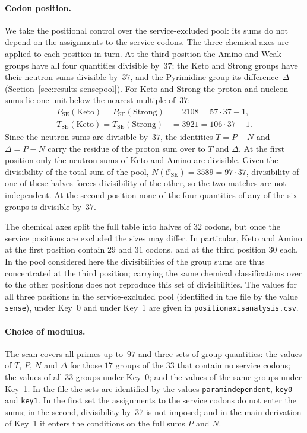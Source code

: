 \documentclass[11pt,a4paper]{article}
\renewcommand{\_}{\origunderscore\allowbreak}
\begin{document}
\paragraph{Codon position.}
We take the positional control over the service-excluded pool: its
sums do not depend on the assignments to the service codons. The
three chemical axes are applied to each position in turn. At the
third position the Amino and Weak groups have all four quantities
divisible by~$37$; the Keto and Strong groups have their neutron
sums divisible by~$37$, and the Pyrimidine group its
difference~$\Delta$ (Section~\ref{sec:results-sensepool}). For Keto
and Strong the proton and nucleon sums lie one unit below the
nearest multiple of~$37$:
\[
\begin{aligned}
P_{\mathrm{SE}}(\mathrm{Keto})
  = P_{\mathrm{SE}}(\mathrm{Strong}) &= 2108=57\cdot37-1,\\
T_{\mathrm{SE}}(\mathrm{Keto})
  = T_{\mathrm{SE}}(\mathrm{Strong}) &= 3921=106\cdot37-1.
\end{aligned}
\]
Since the neutron sums are divisible by~$37$, the identities $T=P+N$
and $\Delta=P-N$ carry the residue of the proton sum over to $T$ and
$\Delta$. At the first position only the neutron sums of Keto and
Amino are divisible. Given the divisibility of the total sum of the
pool, $N(\mathcal C_{\mathrm{SE}})=3589=97\cdot37$, divisibility of
one of these halves forces divisibility of the other, so the two
matches are not independent. At the second position none of the four
quantities of any of the six groups is divisible by~$37$.

The chemical axes split the full table into halves of $32$ codons,
but once the service positions are excluded the sizes may differ. In
particular, Keto and Amino at the first position contain $29$ and
$31$ codons, and at the third position $30$ each. In the pool
considered here the divisibilities of the group sums are thus
concentrated at the third position; carrying the same chemical
classifications over to the other positions does not reproduce this
set of divisibilities. The values for all three positions in the
service-excluded pool (identified in the file by the value
\texttt{sense}), under Key~0 and under Key~1 are given in
\texttt{position\_axis\_analysis.csv}.

\paragraph{Choice of modulus.}
The scan covers all primes up to~$97$ and three sets of group
quantities: the values of $T$, $P$, $N$ and $\Delta$ for those $17$
groups of the $33$ that contain no service codons; the values of all
$33$ groups under Key~0; and the values of the same groups under
Key~1. In the file the sets are identified by the values
\texttt{param\_independent}, \texttt{key0} and \texttt{key1}. In the
first set the assignments to the service codons do not enter the
sums; in the second, divisibility by~$37$ is not imposed; and in the
main derivation of Key~1 it enters the conditions on the full sums
$P$ and $N$.
\end{document}
